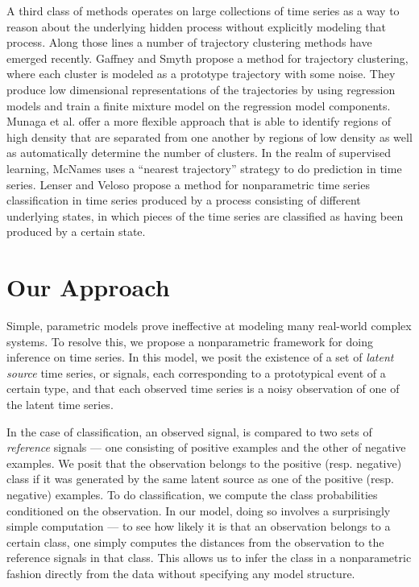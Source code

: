 A third class of methods operates on large collections of time series as a way
to reason about the underlying hidden process without explicitly modeling that
process. Along those lines a number of trajectory clustering methods have
emerged recently. Gaffney and Smyth \cite{Gaffney} propose a method for trajectory
clustering, where each cluster is modeled as a prototype trajectory with some
noise. They produce low dimensional representations of the trajectories by using
regression models and train a finite mixture model on the regression model
components. Munaga et al. \cite{Munaga} offer a more flexible approach that is able to
identify regions of high density that are separated from one another by regions
of low density as well as automatically determine the number of clusters. In the
realm of supervised learning, McNames \cite{McNames} uses a ``nearest trajectory''
strategy to do prediction in time series. Lenser and Veloso \cite{Lenser} propose a
method for nonparametric time series classification in time series produced by a
process consisting of different underlying states, in which pieces of the time
series are classified as having been produced by a certain state.

\section{Our Approach}
Simple, parametric models prove ineffective at modeling many real-world complex
systems. To resolve this, we propose a nonparametric framework for doing
inference on time series. In this model, we posit the existence of a set of {\em
  latent source} time series, or signals, each corresponding to a prototypical
event of a certain type, and that each observed time series is a noisy
observation of one of the latent time series.

In the case of classification, an observed signal, is compared to two sets of
{\em reference} signals --- one consisting of positive examples and the other of
negative examples. We posit that the observation belongs to the positive
(resp. negative) class if it was generated by the same latent source as one of
the positive (resp. negative) examples. To do classification, we compute the
class probabilities conditioned on the observation. In our model, doing so
involves a surprisingly simple computation --- to see how likely it is that an
observation belongs to a certain class, one simply computes the distances from
the observation to the reference signals in that class. This allows us to infer
the class in a nonparametric fashion directly from the data without specifying
any model structure.

